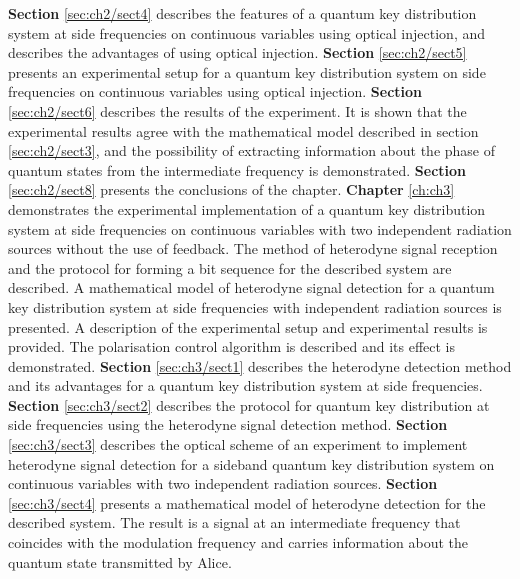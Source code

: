 \newline \textbf{Section} \ref{sec:ch2/sect4} describes the features of a quantum key distribution system at side frequencies on continuous variables using optical injection, and describes the advantages of using optical injection.
\newline \textbf{Section} \ref{sec:ch2/sect5} presents an experimental setup for a quantum key distribution system on side frequencies on continuous variables using optical injection.
\newline \textbf{Section} \ref{sec:ch2/sect6} describes the results of the experiment. It is shown that the experimental results agree with the mathematical model described in section \ref{sec:ch2/sect3}, and the possibility of extracting information about the phase of quantum states from the intermediate frequency is demonstrated.
\newline \textbf{Section} \ref{sec:ch2/sect8} presents the conclusions of the chapter.
\newline \textbf{Chapter} \ref{ch:ch3} demonstrates the experimental implementation of a quantum key distribution system at side frequencies on continuous variables with two independent radiation sources without the use of feedback. The method of heterodyne signal reception and the protocol for forming a bit sequence for the described system are described.  A mathematical model of heterodyne signal detection for a quantum key distribution system at side frequencies with independent radiation sources is presented. A description of the experimental setup and experimental results is provided. The polarisation control algorithm is described and its effect is demonstrated.
\newline \textbf{Section} \ref{sec:ch3/sect1} describes the heterodyne detection method and its advantages for a quantum key distribution system at side frequencies.
\newline \textbf{Section} \ref{sec:ch3/sect2} describes the protocol for quantum key distribution at side frequencies using the heterodyne signal detection method.
\newline \textbf{Section} \ref{sec:ch3/sect3} describes the optical scheme of an experiment to implement heterodyne signal detection for a sideband quantum key distribution system on continuous variables with two independent radiation sources.
\newline \textbf{Section} \ref{sec:ch3/sect4} presents a mathematical model of heterodyne detection for the described system. The result is a signal at an intermediate frequency that coincides with the modulation frequency and carries information about the quantum state transmitted by Alice.
